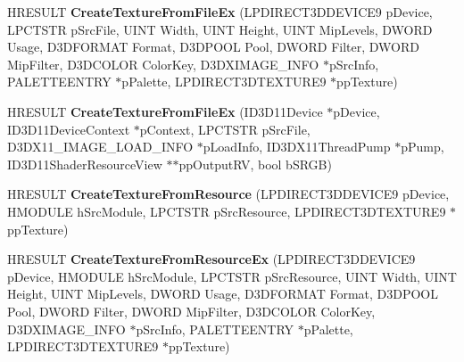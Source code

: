 \begin{DoxyCompactItemize}
\item 
\hypertarget{class_c_d_x_u_t_resource_cache_a4f33257885010dd13d4e996e9d3d2d3e}{H\+R\+E\+S\+U\+L\+T {\bfseries Create\+Texture\+From\+File\+Ex} (L\+P\+D\+I\+R\+E\+C\+T3\+D\+D\+E\+V\+I\+C\+E9 p\+Device, L\+P\+C\+T\+S\+T\+R p\+Src\+File, U\+I\+N\+T Width, U\+I\+N\+T Height, U\+I\+N\+T Mip\+Levels, D\+W\+O\+R\+D Usage, D3\+D\+F\+O\+R\+M\+A\+T Format, D3\+D\+P\+O\+O\+L Pool, D\+W\+O\+R\+D Filter, D\+W\+O\+R\+D Mip\+Filter, D3\+D\+C\+O\+L\+O\+R Color\+Key, D3\+D\+X\+I\+M\+A\+G\+E\+\_\+\+I\+N\+F\+O $\ast$p\+Src\+Info, P\+A\+L\+E\+T\+T\+E\+E\+N\+T\+R\+Y $\ast$p\+Palette, L\+P\+D\+I\+R\+E\+C\+T3\+D\+T\+E\+X\+T\+U\+R\+E9 $\ast$pp\+Texture)}\label{class_c_d_x_u_t_resource_cache_a4f33257885010dd13d4e996e9d3d2d3e}

\item 
\hypertarget{class_c_d_x_u_t_resource_cache_a3f10153cfef0e5a399e434c9f0e35108}{H\+R\+E\+S\+U\+L\+T {\bfseries Create\+Texture\+From\+File\+Ex} (I\+D3\+D11\+Device $\ast$p\+Device, I\+D3\+D11\+Device\+Context $\ast$p\+Context, L\+P\+C\+T\+S\+T\+R p\+Src\+File, D3\+D\+X11\+\_\+\+I\+M\+A\+G\+E\+\_\+\+L\+O\+A\+D\+\_\+\+I\+N\+F\+O $\ast$p\+Load\+Info, I\+D3\+D\+X11\+Thread\+Pump $\ast$p\+Pump, I\+D3\+D11\+Shader\+Resource\+View $\ast$$\ast$pp\+Output\+R\+V, bool b\+S\+R\+G\+B)}\label{class_c_d_x_u_t_resource_cache_a3f10153cfef0e5a399e434c9f0e35108}

\item 
\hypertarget{class_c_d_x_u_t_resource_cache_ac2289531afd466288f7b35b2aa2a8ab1}{H\+R\+E\+S\+U\+L\+T {\bfseries Create\+Texture\+From\+Resource} (L\+P\+D\+I\+R\+E\+C\+T3\+D\+D\+E\+V\+I\+C\+E9 p\+Device, H\+M\+O\+D\+U\+L\+E h\+Src\+Module, L\+P\+C\+T\+S\+T\+R p\+Src\+Resource, L\+P\+D\+I\+R\+E\+C\+T3\+D\+T\+E\+X\+T\+U\+R\+E9 $\ast$pp\+Texture)}\label{class_c_d_x_u_t_resource_cache_ac2289531afd466288f7b35b2aa2a8ab1}

\item 
\hypertarget{class_c_d_x_u_t_resource_cache_a0da1d5be9bcc2332a63b6a9f3dac24c6}{H\+R\+E\+S\+U\+L\+T {\bfseries Create\+Texture\+From\+Resource\+Ex} (L\+P\+D\+I\+R\+E\+C\+T3\+D\+D\+E\+V\+I\+C\+E9 p\+Device, H\+M\+O\+D\+U\+L\+E h\+Src\+Module, L\+P\+C\+T\+S\+T\+R p\+Src\+Resource, U\+I\+N\+T Width, U\+I\+N\+T Height, U\+I\+N\+T Mip\+Levels, D\+W\+O\+R\+D Usage, D3\+D\+F\+O\+R\+M\+A\+T Format, D3\+D\+P\+O\+O\+L Pool, D\+W\+O\+R\+D Filter, D\+W\+O\+R\+D Mip\+Filter, D3\+D\+C\+O\+L\+O\+R Color\+Key, D3\+D\+X\+I\+M\+A\+G\+E\+\_\+\+I\+N\+F\+O $\ast$p\+Src\+Info, P\+A\+L\+E\+T\+T\+E\+E\+N\+T\+R\+Y $\ast$p\+Palette, L\+P\+D\+I\+R\+E\+C\+T3\+D\+T\+E\+X\+T\+U\+R\+E9 $\ast$pp\+Texture)}\label{class_c_d_x_u_t_resource_cache_a0da1d5be9bcc2332a63b6a9f3dac24c6}


\end{DoxyCompactItemize}
